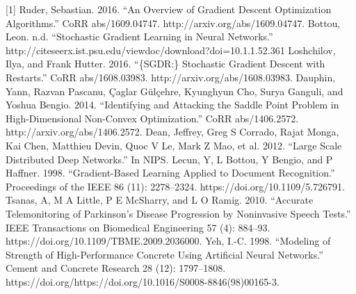 \documentclass{article}
\begin{document}
[1] Ruder, Sebastian. 2016. “An Overview of Gradient Descent Optimization Algorithms.” CoRR abs/1609.04747. http://arxiv.org/abs/1609.04747. \newline \newline
[2] Bottou, Leon. n.d. “Stochastic Gradient Learning in Neural Networks.” http://citeseerx.ist.psu.edu/viewdoc/download?doi=10.1.1.52.361
\newline \newline
[3] Loshchilov, Ilya, and Frank Hutter. 2016. “\{SGDR:\} Stochastic Gradient Descent with Restarts.” CoRR abs/1608.03983. http://arxiv.org/abs/1608.03983.
\newline \newline
[4] Dauphin, Yann, Razvan Pascanu, Çaglar Gülçehre, Kyunghyun Cho, Surya Ganguli, and Yoshua Bengio. 2014. “Identifying and Attacking the Saddle Point Problem in High-Dimensional Non-Convex Optimization.” CoRR abs/1406.2572. http://arxiv.org/abs/1406.2572.
\newline \newline
[5] Dean, Jeffrey, Greg S Corrado, Rajat Monga, Kai Chen, Matthieu Devin, Quoc V Le, Mark Z Mao, et al. 2012. “Large Scale Distributed Deep Networks.” In NIPS.
\newline \newline
[6] Lecun, Y, L Bottou, Y Bengio, and P Haffner. 1998. “Gradient-Based Learning Applied to Document Recognition.” Proceedings of the IEEE 86 (11): 2278–2324. https://doi.org/10.1109/5.726791.
\newline \newline
[7] Tsanas, A, M A Little, P E McSharry, and L O Ramig. 2010. “Accurate Telemonitoring of Parkinson’s Disease Progression by Noninvasive Speech Tests.” IEEE Transactions on Biomedical Engineering 57 (4): 884–93.\\ https://doi.org/10.1109/TBME.2009.2036000.
\newline \newline
[8] Yeh, I.-C. 1998. “Modeling of Strength of High-Performance Concrete Using Artificial Neural Networks.” Cement and Concrete Research 28 (12): 1797–1808. https://doi.org/https://doi.org/10.1016/S0008-8846(98)00165-3.
\end{document}
